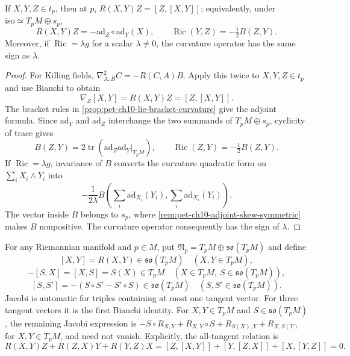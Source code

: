 \begin{theorem}
  \label{thm:pet-ch10-curvature-bracket-formula}

  If $X,Y,Z\in t_p$, then at $p$, $R(X,Y)Z=[Z,[X,Y]]$; equivalently, under
  $\mathrm{iso}\simeq T_pM\oplus s_p$,
  \[
    R(X,Y)Z=-\mathrm{ad}_Z\circ\mathrm{ad}_Y(X),
    \qquad
    \operatorname{Ric}(Y,Z)=-\tfrac12B(Z,Y).
  \]
  Moreover, if $\operatorname{Ric}=\lambda g$ for a scalar $\lambda\ne0$, the curvature
  operator has the same sign as $\lambda$.
\end{theorem}
\begin{proof}
  \sketch
  For Killing fields, $\nabla^2_{A,B}C=-R(C,A)B$. Apply this twice to
  $X,Y,Z\in t_p$ and use Bianchi to obtain
  \[
    \nabla_Z[X,Y]=R(X,Y)Z=[Z,[X,Y]].
  \]
  The bracket rules in \cref{prop:pet-ch10-lie-bracket-curvature} give the
  adjoint formula. Since $\mathrm{ad}_Y$ and $\mathrm{ad}_Z$ interchange the two
  summands of $T_pM\oplus s_p$, cyclicity of trace gives
  \[
    B(Z,Y)=2\operatorname{tr}
      (\mathrm{ad}_Z\mathrm{ad}_Y|_{T_pM}),
    \qquad \operatorname{Ric}(Z,Y)=-\tfrac12B(Z,Y).
  \]
  If $\operatorname{Ric}=\lambda g$, invariance of $B$ converts the curvature
  quadratic form on $\sum_iX_i\wedge Y_i$ into
  \[
    -\frac1{2\lambda}
    B\left(\sum_i\mathrm{ad}_{X_i}(Y_i),
            \sum_i\mathrm{ad}_{X_i}(Y_i)\right).
  \]
  The vector inside $B$ belongs to $s_p$, where
  \cref{rem:pet-ch10-adjoint-skew-symmetric} makes $B$ nonpositive. The
  curvature operator consequently has the sign of $\lambda$.
\end{proof}

\begin{definition}
  \label{def:pet-ch10-abstract-symmetric-bracket}

  For any Riemannian manifold and $p\in M$, put
  $\mathfrak N_p=T_pM\oplus\mathfrak{so}(T_pM)$ and define
  \[
    [X,Y]=R(X,Y)\in\mathfrak{so}(T_pM)\quad(X,Y\in T_pM),
  \]
  \[
    -[S,X]=[X,S]=S(X)\in T_pM\quad(X\in T_pM,\ S\in\mathfrak{so}(T_pM)),
  \]
  \[
    [S,S']=-(S\circ S'-S'\circ S)\in\mathfrak{so}(T_pM)\quad(S,S'\in\mathfrak{so}(T_pM)).
  \]
  Jacobi is automatic for triples containing at most one tangent vector. For
  three tangent vectors it is the first Bianchi identity. For $X,Y\in T_pM$
  and $S\in\mathfrak{so}(T_pM)$, the remaining Jacobi expression is
  $-S\circ R_{X,Y}+R_{X,Y}\circ S+R_{S(X),Y}+R_{X,S(Y)}$ for $X,Y\in T_pM$,
  and need not vanish. Explicitly, the all-tangent relation is
  \[
    R(X,Y)Z+R(Z,X)Y+R(Y,Z)X
    =[Z,[X,Y]]+[Y,[Z,X]]+[X,[Y,Z]]=0.
  \]
\end{definition}

